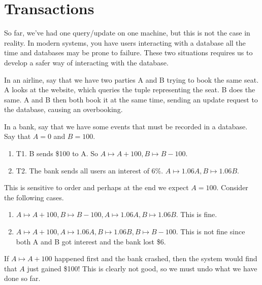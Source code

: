 \section{Transactions} 

  So far, we've had one query/update on one machine, but this is not the case in reality. In modern systems, you have users interacting with a database all the time and databases may be prone to failure. These two situations requires us to develop a safer way of interacting with the database. 

  \begin{example}
    In an airline, say that we have two parties A and B trying to book the same seat. A looks at the website, which queries the tuple representing the seat. B does the same. A and B then both book it at the same time, sending an update request to the database, causing an overbooking. 

    In a bank, say that we have some events that must be recorded in a database. Say that $A = 0$ and $B = 100$. 
    \begin{enumerate}
      \item T1. B sends \$100 to A. So $A \mapsto A + 100, B \mapsto B - 100$. 
      \item T2. The bank sends all users an interest of 6\%. $A \mapsto 1.06 A, B \mapsto 1.06B$. 
    \end{enumerate}
    This is sensitive to order and perhaps at the end we expect $A = 100$. Consider the following cases. 
    \begin{enumerate} 
      \item $A \mapsto A + 100, B \mapsto B - 100, A \mapsto 1.06A, B \mapsto 1.06B$. This is fine. 
      \item $A \mapsto A + 100, A \mapsto 1.06A, B \mapsto 1.06B, B \mapsto B - 100$. This is not fine since both A and B got interest and the bank lost \$6. 
    \end{enumerate}
  \end{example}

  \begin{example}
    If $A \mapsto A + 100$ happened first and the bank crashed, then the system would find that $A$ just gained \$100! This is clearly not good, so we must undo what we have done so far. 
  \end{example}

